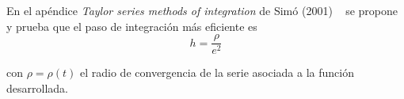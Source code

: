 En el apéndice \textit{Taylor series methods of integration} de Simó (2001) ~\cite{Simo2001} se propone y prueba que el paso de integración más eficiente es 
\begin{equation}
 h = \frac{\rho}{e^{2}}
\end{equation}

con $\rho = \rho(t)$ el radio de convergencia de la serie asociada a la función desarrollada. 